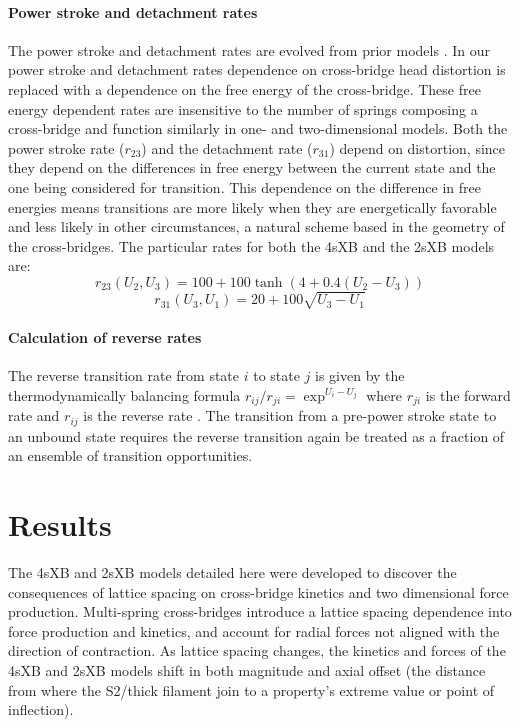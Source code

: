 \documentclass[]{article}
\begin{document}
\paragraph{Power stroke and detachment rates} %
The power stroke and detachment rates are evolved from prior models \citep{Pate1989, Tanner2007}. 
In our power stroke and detachment rates dependence on cross-bridge head distortion is replaced with a dependence on the free energy of the cross-bridge.
These free energy dependent rates are insensitive to the number of springs composing a cross-bridge and function similarly in one- and two-dimensional models. 
Both the power stroke rate ($r_{23}$) and the detachment rate ($r_{31}$) depend on distortion, since they depend on the differences in free energy between the current state and the one being considered for transition.  
This dependence on the difference in free energies means transitions are more likely when they are energetically favorable and less likely in other circumstances, a natural scheme based in the geometry of the cross-bridges.
The particular rates for both the 4sXB and the 2sXB models are: 
$$r_{23}(U_2, U_3) = 100 + 100\tanh(4 + 0.4 (U_2 - U_3)) $$
$$r_{31}(U_3, U_1) = 20 + 100 \sqrt{U_3 - U_1} $$

\paragraph{Calculation of reverse rates} %
The reverse transition rate from state $i$ to state $j$ is given by the thermodynamically balancing formula $r_{ij}/r_{ji}=\exp^{U_i-U_j}$ where $r_{ji}$ is the forward rate and $r_{ij}$ is the reverse rate \citep{Pate1989, Daniel1998, Tanner2007}.
The transition from a pre-power stroke state to an unbound state requires the reverse transition again be treated as a fraction of an ensemble of transition opportunities. 



\section*{Results} %

The 4sXB and 2sXB models detailed here were developed to discover the consequences of lattice spacing on cross-bridge kinetics and two dimensional force production.
Multi-spring cross-bridges introduce a lattice spacing dependence into force production and kinetics, and account for radial forces not aligned with the direction of contraction. 
As lattice spacing changes, the kinetics and forces of the 4sXB and 2sXB models shift in both magnitude and axial offset (the distance from where the S2/thick filament join to a property's extreme value or point of inflection).
\end{document}
